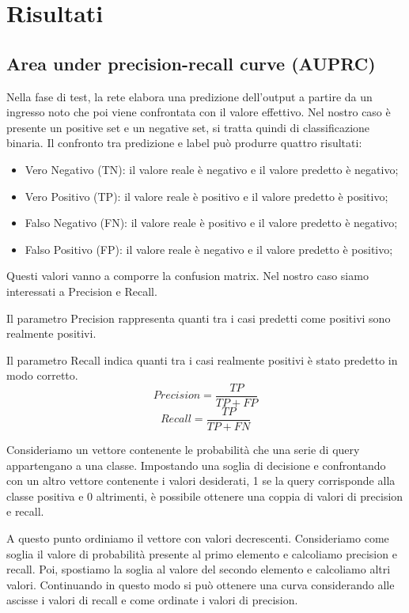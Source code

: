 \documentclass[12pt,a4paper,titlepage]{article}
\begin{document}
\clearpage

\section{Risultati}
\label{sec:risultati}
\subsection{Area under precision-recall curve (AUPRC)}
Nella fase di test, la rete elabora una predizione dell'output a partire da un ingresso noto che poi viene confrontata con il valore effettivo.
Nel nostro caso è presente un positive set e un negative set, si tratta quindi di classificazione binaria.
Il confronto tra predizione e label può produrre quattro risultati:
\begin{itemize}
	\item Vero Negativo (TN): il valore reale è negativo e il valore predetto è negativo;
	\item Vero Positivo (TP): il valore reale è positivo e il valore predetto	è positivo;
	\item Falso Negativo (FN): il valore reale è positivo e il valore predetto è negativo;
	\item Falso Positivo (FP): il valore reale è negativo e il valore predetto	è positivo;
\end{itemize}
Questi valori vanno a comporre la confusion matrix.
Nel nostro caso siamo interessati a Precision e Recall.

Il parametro Precision rappresenta quanti tra i casi predetti come positivi sono realmente positivi.

Il parametro Recall indica quanti tra i casi realmente positivi è stato predetto in modo corretto.
\begin{equation}
Precision=\frac{TP}{TP+FP}
\end{equation}
\begin{equation}
Recall=\frac{TP}{TP+FN}
\end{equation}

Consideriamo un vettore contenente le probabilità che una serie di query appartengano a una classe. Impostando una soglia di decisione e confrontando con un altro vettore contenente i valori desiderati, 1 se la query corrisponde alla classe positiva e 0 altrimenti, è possibile ottenere una coppia di valori di precision e recall.

A questo punto ordiniamo il vettore con valori decrescenti.
Consideriamo come soglia il valore di probabilità presente al primo elemento e calcoliamo precision e recall.
Poi, spostiamo la soglia al valore del secondo elemento e calcoliamo altri valori.
Continuando in questo modo si può ottenere una curva considerando alle ascisse i valori di recall e come ordinate i valori di precision.
\end{document}
